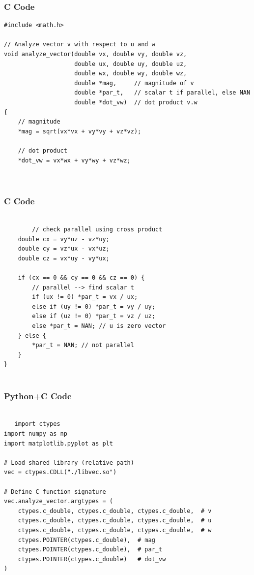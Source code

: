\documentclass{beamer}
\begin{document}
\begin{frame}[fragile]
    \frametitle{C Code}

    \begin{lstlisting}
#include <math.h>

// Analyze vector v with respect to u and w
void analyze_vector(double vx, double vy, double vz,
                    double ux, double uy, double uz,
                    double wx, double wy, double wz,
                    double *mag,     // magnitude of v
                    double *par_t,   // scalar t if parallel, else NAN
                    double *dot_vw)  // dot product v.w
{
    // magnitude
    *mag = sqrt(vx*vx + vy*vy + vz*vz);

    // dot product
    *dot_vw = vx*wx + vy*wy + vz*wz;

  
    \end{lstlisting}
\end{frame}

\begin{frame}[fragile]
    \frametitle{C Code}
    \begin{lstlisting}
    
        // check parallel using cross product
    double cx = vy*uz - vz*uy;
    double cy = vz*ux - vx*uz;
    double cz = vx*uy - vy*ux;

    if (cx == 0 && cy == 0 && cz == 0) {
        // parallel --> find scalar t
        if (ux != 0) *par_t = vx / ux;
        else if (uy != 0) *par_t = vy / uy;
        else if (uz != 0) *par_t = vz / uz;
        else *par_t = NAN; // u is zero vector
    } else {
        *par_t = NAN; // not parallel
    }
}


    \end{lstlisting}
\end{frame}

\begin{frame}[fragile]
    \frametitle{Python+C Code}
    \begin{lstlisting}
    
   import ctypes
import numpy as np
import matplotlib.pyplot as plt

# Load shared library (relative path)
vec = ctypes.CDLL("./libvec.so")

# Define C function signature
vec.analyze_vector.argtypes = (
    ctypes.c_double, ctypes.c_double, ctypes.c_double,  # v
    ctypes.c_double, ctypes.c_double, ctypes.c_double,  # u
    ctypes.c_double, ctypes.c_double, ctypes.c_double,  # w
    ctypes.POINTER(ctypes.c_double),  # mag
    ctypes.POINTER(ctypes.c_double),  # par_t
    ctypes.POINTER(ctypes.c_double)   # dot_vw
)







    \end{lstlisting}
\end{frame}
\end{document}
